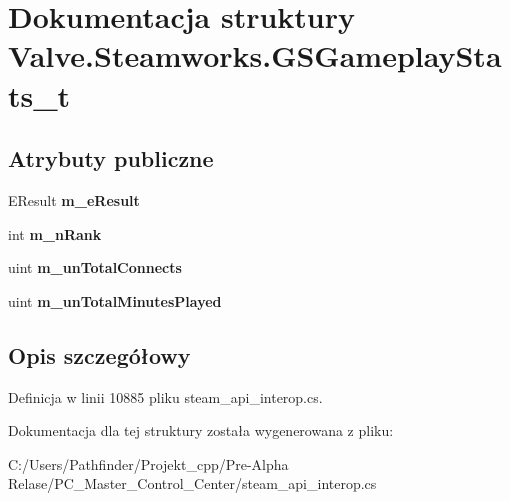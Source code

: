 \hypertarget{struct_valve_1_1_steamworks_1_1_g_s_gameplay_stats__t}{}\section{Dokumentacja struktury Valve.\+Steamworks.\+G\+S\+Gameplay\+Stats\+\_\+t}
\label{struct_valve_1_1_steamworks_1_1_g_s_gameplay_stats__t}
\subsection*{Atrybuty publiczne}
\begin{DoxyCompactItemize}
\item 
\mbox{\label{struct_valve_1_1_steamworks_1_1_g_s_gameplay_stats__t_ab240284927b93c9d79427f3ffd70f738}} 
E\+Result {\bfseries m\+\_\+e\+Result}
\item 
\mbox{\label{struct_valve_1_1_steamworks_1_1_g_s_gameplay_stats__t_ae483bac75de7a01372ed95b850746a79}} 
int {\bfseries m\+\_\+n\+Rank}
\item 
\mbox{\label{struct_valve_1_1_steamworks_1_1_g_s_gameplay_stats__t_a9c00fc431bcee90805821c066c4a52dd}} 
uint {\bfseries m\+\_\+un\+Total\+Connects}
\item 
\mbox{\label{struct_valve_1_1_steamworks_1_1_g_s_gameplay_stats__t_a10eee0f3ff57e09b0dc294b9fb66aeac}} 
uint {\bfseries m\+\_\+un\+Total\+Minutes\+Played}
\end{DoxyCompactItemize}


\subsection{Opis szczegółowy}


Definicja w linii 10885 pliku steam\+\_\+api\+\_\+interop.\+cs.



Dokumentacja dla tej struktury została wygenerowana z pliku\+:\begin{DoxyCompactItemize}
\item 
C\+:/\+Users/\+Pathfinder/\+Projekt\+\_\+cpp/\+Pre-\/\+Alpha Relase/\+P\+C\+\_\+\+Master\+\_\+\+Control\+\_\+\+Center/steam\+\_\+api\+\_\+interop.\+cs\end{DoxyCompactItemize}

